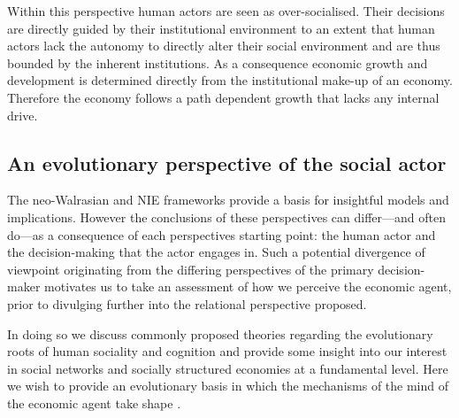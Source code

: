 Within this perspective human actors are seen as over-socialised. Their decisions are directly guided by their institutional environment to an extent that human actors lack the autonomy to directly alter their social environment and are thus bounded by the inherent institutions. As a consequence economic growth and development is determined directly from the institutional make-up of an economy. Therefore the economy follows a path dependent growth that lacks any internal drive.

\subsection{An evolutionary perspective of the social actor}

The neo-Walrasian and NIE frameworks provide a basis for insightful models and implications. However the conclusions of these perspectives can differ---and often do---as a consequence of each perspectives starting point: the human actor and the decision-making that the actor engages in. Such a potential divergence of viewpoint originating from the differing perspectives of the primary decision-maker motivates us to take an assessment of how we perceive the economic agent, prior to divulging further into the relational perspective proposed.




In doing so we discuss commonly proposed theories regarding the evolutionary roots of human sociality and cognition and provide some insight into our interest in social networks and socially structured economies at a fundamental level. Here we wish to provide an evolutionary basis in which the mechanisms of the mind of the economic agent take shape \citep{Pinker1997}. 

